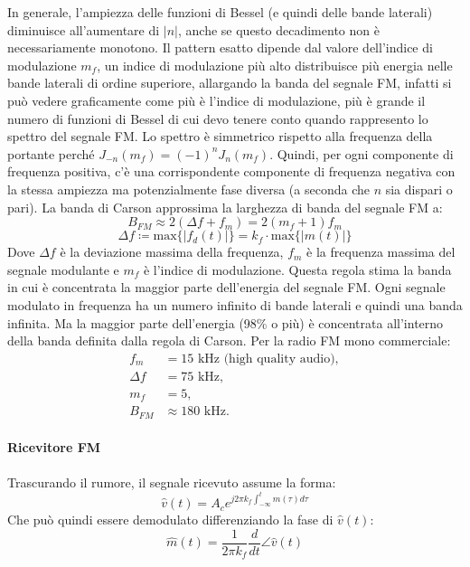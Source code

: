 In generale, l'ampiezza delle funzioni di Bessel (e quindi delle bande laterali) diminuisce all'aumentare di \( |n| \), anche se questo decadimento non è necessariamente monotono.
Il pattern esatto dipende dal valore dell'indice di modulazione \( m_f \), un indice di modulazione più alto distribuisce più energia nelle bande laterali di ordine superiore, allargando la banda del segnale FM,
infatti si può vedere graficamente come più è l'indice di modulazione, più è grande il numero di funzioni di Bessel di cui devo tenere conto quando rappresento lo spettro del segnale FM.
Lo spettro è simmetrico rispetto alla frequenza della portante perché \( J_{-n}(m_f) = (-1)^n J_n(m_f) \). Quindi, per ogni componente di frequenza positiva, c'è una corrispondente componente di frequenza negativa con la stessa ampiezza ma potenzialmente fase diversa (a seconda che \( n \) sia dispari o pari).
La banda di Carson approssima la larghezza di banda del segnale FM a:
\[
    B_{FM} \approx 2(\Delta f + f_{m}) = 2(m_f + 1) f_{m}
\]
\[
    \Delta f \coloneqq \text{max} \{ | f_d(t) | \} = k_f \cdot \text{max} \{ | m(t) | \}
\]
Dove \( \Delta f \) è la deviazione massima della frequenza, \( f_{m} \) è la frequenza massima del segnale modulante e \( m_f \) è l'indice di modulazione.
Questa regola stima la banda in cui è concentrata la maggior parte dell'energia del segnale FM.
Ogni segnale modulato in frequenza ha un numero infinito di bande laterali e quindi una banda infinita. Ma la maggior parte dell'energia (98\% o più) è concentrata all'interno della banda definita dalla regola di Carson. Per la radio FM mono commerciale:
\begin{align*}
f_m &= 15 \text{ kHz (high quality audio)}, \\
\Delta f &= 75 \text{ kHz}, \\
m_f &= 5, \\
B_{FM} &\approx 180 \text{ kHz}.
\end{align*}

\paragraph*{Ricevitore FM}
Trascurando il rumore, il segnale ricevuto assume la forma:
\[
\hat{v}(t) = A_c e^{j2\pi k_f \int_{-\infty}^{t} m(\tau) d\tau}
\]
Che può quindi essere demodulato differenziando la fase di \( \hat{v}(t) \):
\[
\hat{m}(t) = \frac{1}{2\pi k_f} \frac{d}{dt} \angle \hat{v}(t)
\]


